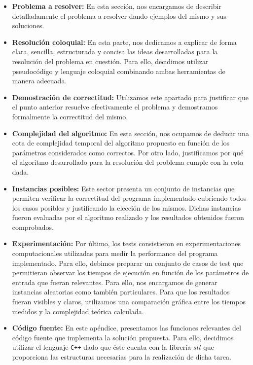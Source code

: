\documentclass[10pt, a4paper]{article}
\begin{document}
\begin{itemize}
\item \textbf{Problema a resolver:} En esta sección, nos encargamos de describir detalladamente el problema a resolver dando ejemplos del mismo y sus soluciones.
\item \textbf{Resolución coloquial:} En esta parte, nos dedicamos a explicar de forma clara, sencilla, estructurada y concisa las ideas desarrolladas para la resolución del problema en cuestión. Para ello, decidimos utilizar pseudocódigo y lenguaje coloquial combinando ambas herramientas de manera adecuada.
\item \textbf{Demostración de correctitud:} Utilizamos este apartado para justificar que el punto anterior resuelve efectivamente el problema y demostramos formalmente la correctitud del mismo.
\item \textbf{Complejidad del algoritmo:} En esta sección, nos ocupamos de deducir una cota de complejidad temporal del algoritmo propuesto en función de los parámetros considerados como correctos. Por otro lado, justificamos por qué el algoritmo desarrollado para la resolución del problema cumple con la cota dada.
\item \textbf{Instancias posibles:} Este sector presenta un conjunto de instancias que permiten verificar la correctitud del programa implementado cubriendo todos los casos posibles y justificando la elección de los mismos. Dichas instancias fueron evaluadas por el algoritmo realizado y los resultados obtenidos fueron comprobados.
\item \textbf{Experimentación:} Por último, los tests consistieron en experimentaciones computacionales utilizadas para medir la performance del programa implementado. Para ello, debimos preparar un conjunto de casos de test que permitieran observar los tiempos de ejecución en función de los parámetros de entrada que fueran relevantes. Para ello, nos encargamos de generar instancias aleatorias como también particulares. Para que los resultados fueran visibles y claros, utilizamos una comparación gráfica entre los tiempos medidos y la complejidad teórica calculada.
\item \textbf{Código fuente:} En este apéndice, presentamos las funciones relevantes del código fuente que implementa la solución propuesta. Para ello, decidimos utilizar el lenguaje \verb*#C++# dado que éste cuenta con la librería $stl$ que proporciona las estructuras necesarias para la realización de dicha tarea.
\end{itemize}
\newpage
\end{document}
